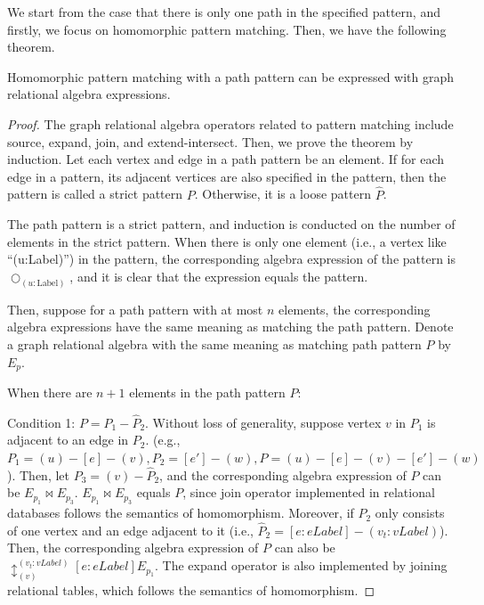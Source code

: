 We start from the case that there is only one path in the specified pattern, and firstly, we focus on homomorphic pattern matching.
Then, we have the following theorem.

\begin{theorem}
    Homomorphic pattern matching with a path pattern can be expressed with graph relational algebra expressions.
\end{theorem}
\begin{proof}
    The graph relational algebra operators related to pattern matching include source, expand, join, and extend-intersect.
    Then, we prove the theorem by induction.
    Let each vertex and edge in a path pattern be an element.
    If for each edge in a pattern, its adjacent vertices are also specified in the pattern, then the pattern is called a strict pattern $P$.
    Otherwise, it is a loose pattern $\hat{P}$.

    The path pattern is a strict pattern, and induction is conducted on the number of elements in the strict pattern.
    When there is only one element (i.e., a vertex like ``(u:Label)'') in the pattern, the corresponding algebra expression of the pattern is $\bigcirc_{(u:\text{Label})}$, and it is clear that the expression equals the pattern.

    Then, suppose for a path pattern with at most $n$ elements, the corresponding algebra expressions have the same meaning as matching the path pattern.
    Denote a graph relational algebra with the same meaning as matching path pattern $P$ by $E_p$.

    When there are $n + 1$ elements in the path pattern $P$:



    Condition 1: $P = P_1 - \hat{P}_2$.
    Without loss of generality, suppose vertex $v$ in $P_1$ is adjacent to an edge in $P_2$.
    (e.g., $P_1 = (u)-[e]-(v), P_2 = [e']-(w), P = (u)-[e]-(v)-[e']-(w)$).
    Then, let $P_3 = (v)-\hat{P}_2$, and the corresponding algebra expression of $P$ can be $E_{p_1} \Join E_{p_3}$.
    $E_{p_1} \Join E_{p_3}$ equals $P$, since join operator implemented in relational databases follows the semantics of homomorphism.
    Moreover, if $\hat{P}_2$ only consists of one vertex and an edge adjacent to it (i.e., $\hat{P}_2 = [e:eLabel]-(v_t:vLabel)$).
    Then, the corresponding algebra expression of $P$ can also be $\updownarrow_{(v)}^{(v_t:vLabel)}[e:eLabel]E_{p_1}$.
    The expand operator is also implemented by joining relational tables, which follows the semantics of homomorphism.


\end{proof}
